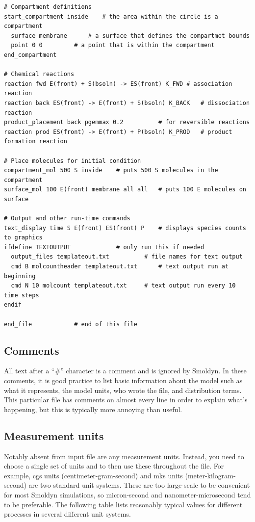 \documentclass {book}
\begin{document}
\begin{lstlisting}[style=SSAC]
# Compartment definitions
start_compartment inside	# the area within the circle is a compartment
  surface membrane		# a surface that defines the compartmet bounds
  point 0 0			# a point that is within the compartment
end_compartment

# Chemical reactions
reaction fwd E(front) + S(bsoln) -> ES(front) K_FWD	# association reaction
reaction back ES(front) -> E(front) + S(bsoln) K_BACK 	# dissociation reaction
product_placement back pgemmax 0.2			# for reversible reactions
reaction prod ES(front) -> E(front) + P(bsoln) K_PROD	# product formation reaction

# Place molecules for initial condition
compartment_mol 500 S inside	# puts 500 S molecules in the compartment
surface_mol 100 E(front) membrane all all	# puts 100 E molecules on surface

# Output and other run-time commands
text_display time S E(front) ES(front) P	# displays species counts to graphics
ifdefine TEXTOUTPUT				# only run this if needed
  output_files templateout.txt			# file names for text output
  cmd B molcountheader templateout.txt		# text output run at beginning
  cmd N 10 molcount templateout.txt		# text output run every 10 time steps
endif

end_file			# end of this file
\end{lstlisting}

\subsection*{Comments}

All text after a ``\#'' character is a comment and is ignored by Smoldyn.  In these comments, it is good practice to list basic information about the model such as what it represents, the model units, who wrote the file, and distribution terms.  This particular file has comments on almost every line in order to explain what's happening, but this is typically more annoying than useful.

\subsection*{Measurement units}

Notably absent from input file are any measurement units. Instead, you need to choose a single set of units and to then use these throughout the file. For example, cgs units (centimeter-gram-second) and mks units (meter-kilogram-second) are two standard unit systems. These are too large-scale to be convenient for most Smoldyn simulations, so micron-second and nanometer-microsecond tend to be preferable. The following table lists reasonably typical values for different processes in several different unit systems.
\end{document}
